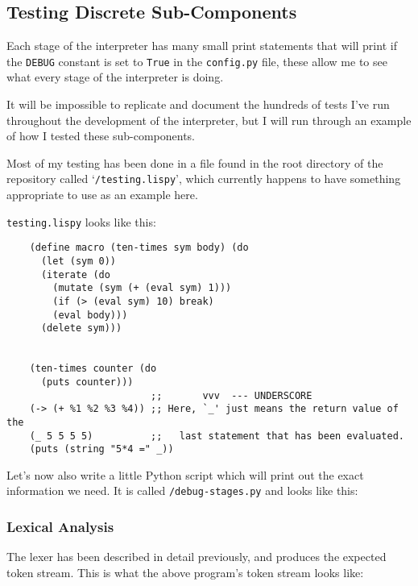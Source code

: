 \documentclass{article}
\newcommand{\code}[1]{\texttt{#1}}
\begin{document}
  \subsection{Testing Discrete Sub-Components}
    Each stage of the interpreter has many small print statements that will
    print if the \code{DEBUG} constant is set to \code{True} in the \code{config.py}
    file, these allow me to see what every stage of the interpreter is doing.

    It will be impossible to replicate and document the hundreds of tests
    I've run throughout the development of the interpreter, but I will run through
    an example of how I tested these sub-components.

    Most of my testing has been done in a file found in the root directory of
    the repository called `\code{/testing.lispy}', which currently happens
    to have something appropriate to use as an example here.

    \code{testing.lispy} looks like this:

    \begin{verbatim}
    (define macro (ten-times sym body) (do
      (let (sym 0))
      (iterate (do
        (mutate (sym (+ (eval sym) 1)))
        (if (> (eval sym) 10) break)
        (eval body)))
      (delete sym)))


    (ten-times counter (do
      (puts counter)))
                         ;;       vvv  --- UNDERSCORE
    (-> (+ %1 %2 %3 %4)) ;; Here, `_' just means the return value of the
    (_ 5 5 5 5)          ;;   last statement that has been evaluated.
    (puts (string "5*4 =" _))
    \end{verbatim}


    Let's now also write a little Python script which will print
    out the exact information we need. It is called \code{/debug-stages.py}
    and looks like this:



    \subsubsection{Lexical Analysis}
      The lexer has been described in detail previously, and produces the
      expected token stream. This is what the above program's token
      stream looks like:
\end{document}
